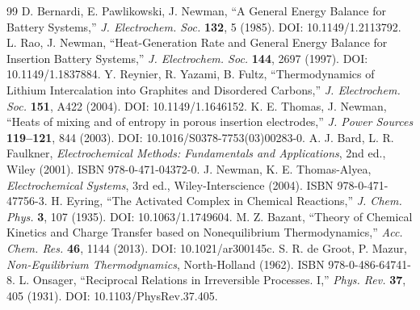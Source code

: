 \documentclass[11pt,a4paper]{article}
\begin{document}
\begin{thebibliography}{99}
 D. Bernardi, E. Pawlikowski, J. Newman, ``A General Energy Balance for Battery Systems,'' \emph{J. Electrochem. Soc.} \textbf{132}, 5 (1985). DOI: 10.1149/1.2113792.
 L. Rao, J. Newman, ``Heat-Generation Rate and General Energy Balance for Insertion Battery Systems,'' \emph{J. Electrochem. Soc.} \textbf{144}, 2697 (1997). DOI: 10.1149/1.1837884.
 Y. Reynier, R. Yazami, B. Fultz, ``Thermodynamics of Lithium Intercalation into Graphites and Disordered Carbons,'' \emph{J. Electrochem. Soc.} \textbf{151}, A422 (2004). DOI: 10.1149/1.1646152.
 K. E. Thomas, J. Newman, ``Heats of mixing and of entropy in porous insertion electrodes,'' \emph{J. Power Sources} \textbf{119--121}, 844 (2003). DOI: 10.1016/S0378-7753(03)00283-0.
 A. J. Bard, L. R. Faulkner, \emph{Electrochemical Methods: Fundamentals and Applications}, 2nd ed., Wiley (2001). ISBN 978-0-471-04372-0.
 J. Newman, K. E. Thomas-Alyea, \emph{Electrochemical Systems}, 3rd ed., Wiley-Interscience (2004). ISBN 978-0-471-47756-3.
 H. Eyring, ``The Activated Complex in Chemical Reactions,'' \emph{J. Chem. Phys.} \textbf{3}, 107 (1935). DOI: 10.1063/1.1749604.
 M. Z. Bazant, ``Theory of Chemical Kinetics and Charge Transfer based on Nonequilibrium Thermodynamics,'' \emph{Acc. Chem. Res.} \textbf{46}, 1144 (2013). DOI: 10.1021/ar300145c.
 S. R. de Groot, P. Mazur, \emph{Non-Equilibrium Thermodynamics}, North-Holland (1962). ISBN 978-0-486-64741-8.
 L. Onsager, ``Reciprocal Relations in Irreversible Processes. I,'' \emph{Phys. Rev.} \textbf{37}, 405 (1931). DOI: 10.1103/PhysRev.37.405.
\end{thebibliography}
\end{document}

